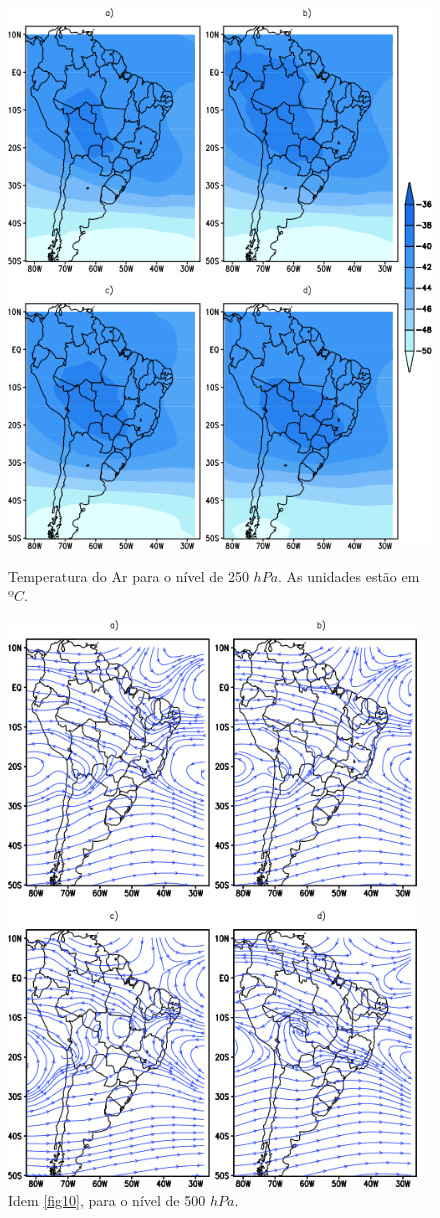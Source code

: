 \begin{figure}[!hbp]
\centering
\includegraphics[height=15cm]{./figs/media_temp_anl_250hPa.png}
\caption{Temperatura do Ar para o nível de 250 $hPa$. As unidades estão em $ºC$.}
\label{fig13}
\end{figure}

\begin{figure}[!hbp]
\centering
\includegraphics[height=15cm]{./figs/media_corrente_anl_500hPa.png}
\caption{Idem \autoref{fig10}, para o nível de 500 $hPa$.}
\label{fig14}
\end{figure}


